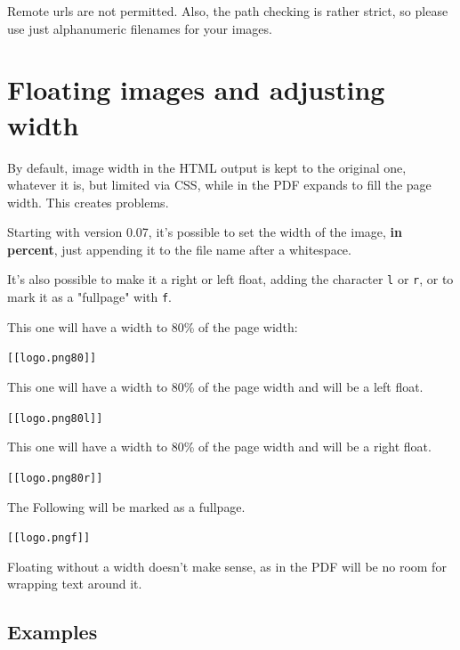 \documentclass[DIV=12,%
               BCOR=0mm,%
               fontsize=10pt,%
               oneside,%
               paper=210mm:11in]{scrbook}
\begin{document}
Remote urls are not permitted. Also, the path checking is rather
strict, so please use just alphanumeric filenames for your images.

\section{Floating images and adjusting width}


By default, image width in the HTML output is kept to the original
one, whatever it is, but limited via CSS, while in the PDF expands to
fill the page width. This creates problems.


Starting with version 0.07, it's possible to set the width of the
image, \textbf{in percent}, just appending it to the file name after a
whitespace.


It's also possible to make it a right or left float, adding the
character \texttt{l} or \texttt{r}, or to mark it as a "fullpage" with \texttt{f}.


This one will have a width to 80\% of the page width:


\begin{alltt}
[[logo.png 80]]

\end{alltt}


This one will have a width to 80\% of the page width and will be a left
float.


\begin{alltt}
[[logo.png 80 l]]

\end{alltt}


This one will have a width to 80\% of the page width and will be a right
float.


\begin{alltt}
[[logo.png 80 r]]

\end{alltt}


The Following will be marked as a fullpage.


\begin{alltt}
[[logo.png f]]

\end{alltt}


Floating without a width doesn't make sense, as in the PDF will be no
room for wrapping text around it.

\subsection{Examples}
\end{document}
